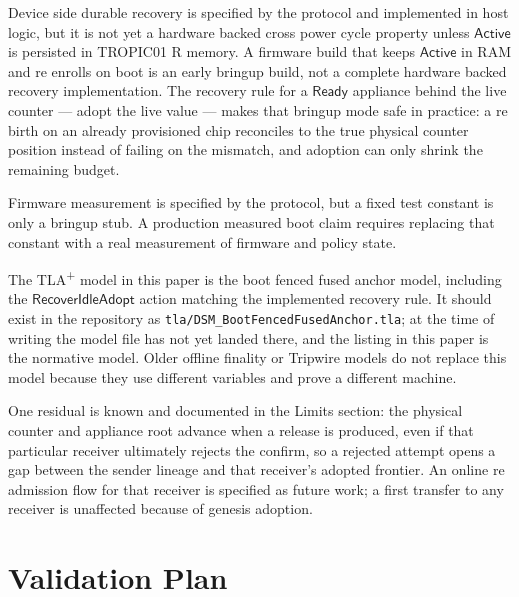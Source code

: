 \documentclass[11pt]{article}
\theoremstyle{definition}
\theoremstyle{remark}
\newcommand{\Active}{\ensuremath{\mathsf{Active}}}
\newcommand{\Ready}{\ensuremath{\mathsf{Ready}}}
\begin{document}
Device side durable recovery is specified by the protocol and implemented in host logic, but it is
not yet a hardware backed cross power cycle property unless \(\Active\) is persisted in TROPIC01
R memory. A firmware build that keeps \(\Active\) in RAM and re enrolls on boot is an early
bringup build, not a complete hardware backed recovery implementation. The recovery rule for a
\(\Ready\) appliance behind the live counter --- adopt the live value --- makes that bringup mode
safe in practice: a re birth on an already provisioned chip reconciles to the true physical
counter position instead of failing on the mismatch, and adoption can only shrink the remaining
budget.

Firmware measurement is specified by the protocol, but a fixed test constant is only a bringup
stub. A production measured boot claim requires replacing that constant with a real measurement of
firmware and policy state.

The TLA\texorpdfstring{\textsuperscript{+}}{+} model in this paper is the boot fenced fused
anchor model, including the \(\mathsf{RecoverIdleAdopt}\) action matching the implemented
recovery rule. It should exist in the repository as
\texttt{tla/DSM\_BootFencedFusedAnchor.tla}; at the time of writing the model file has not yet
landed there, and the listing in this paper is the normative model. Older offline finality or
Tripwire models do not replace this model because they use different variables and prove a
different machine.

One residual is known and documented in the Limits section: the physical counter and appliance
root advance when a release is produced, even if that particular receiver ultimately rejects the
confirm, so a rejected attempt opens a gap between the sender lineage and that receiver's adopted
frontier. An online re admission flow for that receiver is specified as future work; a first
transfer to any receiver is unaffected because of genesis adoption.

\section{Validation Plan}
\end{document}
